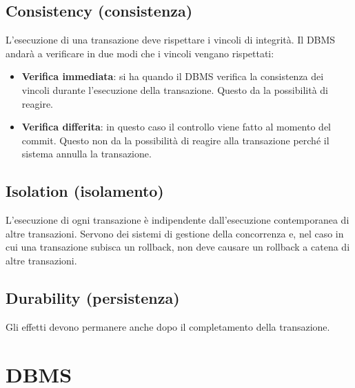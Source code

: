 \documentclass[11pt]{report}
\begin{document}
\subsection{Consistency (consistenza)}

L'esecuzione di una transazione deve rispettare i vincoli di integrità. Il DBMS andarà a verificare in due modi che i vincoli vengano rispettati:
\begin{itemize}
\item \textbf{Verifica immediata}: si ha quando il DBMS verifica la consistenza dei vincoli durante l'esecuzione della transazione. Questo da la possibilit\`a di reagire.
\item \textbf{Verifica differita}: in questo caso il controllo viene fatto al momento del commit. Questo non da la possibilit\`a di reagire alla transazione perch\'e il sistema annulla la transazione.
\end{itemize}

\subsection{Isolation (isolamento)}

L'esecuzione di ogni transazione \`e indipendente dall'esecuzione contemporanea di altre transazioni. Servono dei sistemi di gestione della concorrenza e, nel caso in cui una transazione subisca un rollback, non deve causare un rollback a catena di altre transazioni.

\subsection{Durability (persistenza)}

Gli effetti devono permanere anche dopo il completamento della transazione.

\section{DBMS}
\end{document}
